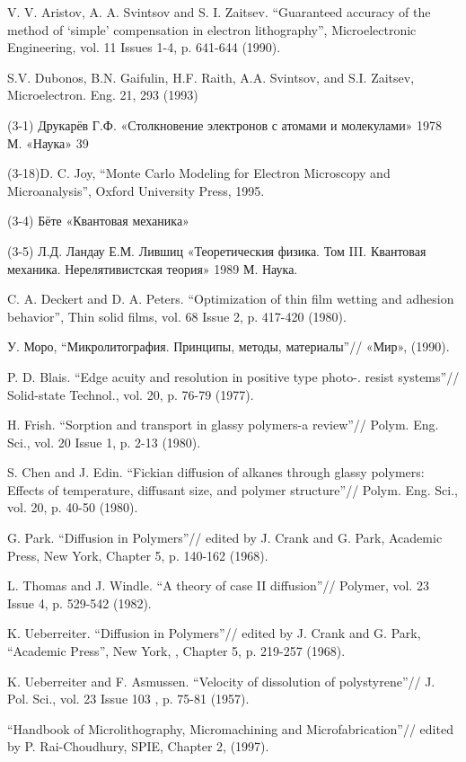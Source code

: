 \begin{thebibliography}{99}
 V. V. Aristov, A. A. Svintsov and S. I. Zaitsev. ``Guaranteed accuracy of
the method of ‘simple’ compensation in electron lithography'',
Microelectronic Engineering, vol. 11 Issues 1-4, p. 641-644 (1990).
    
 S.V. Dubonos, B.N. Gaifulin, H.F. Raith, A.A. Svintsov, and S.I. Zaitsev,
Microelectron. Eng. 21, 293 (1993)
    
 (3-1) Друкарёв Г.Ф. «Столкновение электронов с атомами и
молекулами» 1978 М. «Наука»
39
    
 (3-18)D. C. Joy, ``Monte Carlo Modeling for Electron Microscopy and
Microanalysis'', Oxford University Press, 1995.
    
 (3-4) Бёте «Квантовая механика»
    
 (3-5) Л.Д. Ландау Е.М. Лившиц «Теоретическия физика. Том III.
Квантовая механика. Нерелятивистская теория» 1989 М. Наука.
    
 C. A. Deckert and D. A. Peters. ``Optimization of thin film wetting and
adhesion behavior'', Thin solid films, vol. 68 Issue 2, p. 417-420 (1980).
    
 У. Моро, ``Микролитография. Принципы, методы, материалы''//
«Мир», (1990).
    
 P. D. Blais. ``Edge acuity and resolution in positive type photo-. resist
systems''// Solid-state Technol., vol. 20, p. 76-79 (1977).
    
 H. Frish. ``Sorption and transport in glassy polymers-a review''// Polym.
Eng. Sci., vol. 20 Issue 1, p. 2-13 (1980).
    
 S. Chen and J. Edin. ``Fickian diffusion of alkanes through glassy
polymers: Effects of temperature, diffusant size, and polymer structure''//
Polym. Eng. Sci., vol. 20, p. 40-50 (1980).
    
 G. Park. ``Diffusion in Polymers''// edited by J. Crank and G. Park,
Academic Press, New York, Chapter 5, p. 140-162 (1968).
    
 L. Thomas and J. Windle. ``A theory of case II diffusion''// Polymer, vol.
23 Issue 4, p. 529-542 (1982).
    
 K. Ueberreiter. ``Diffusion in Polymers''// edited by J. Crank and G. Park, ``Academic Press'', New York, , Chapter 5, p. 219-257 (1968).
    
 K. Ueberreiter and F. Asmussen. ``Velocity of dissolution of
polystyrene''// J. Pol. Sci., vol. 23 Issue 103 , p. 75-81 (1957).
    
 ``Handbook of Microlithography, Micromachining and Microfabrication''// edited by P. Rai-Choudhury, SPIE, Chapter 2, (1997).

\end{thebibliography}
